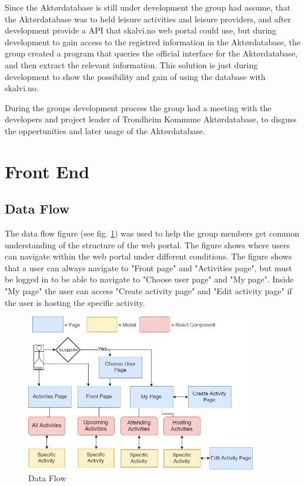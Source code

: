 Since the Aktørdatabase is still under development the group had assume, that the Aktørdatabase was to held leisure activities and leisure providers, and after development provide a API that skalvi.no web portal could use, but during development to gain access to the registred information in the Aktørdatabase, the group created a program that queries the official interface for the Aktørdatabase, and then extract the relevant information. This solution is just during development to show the possibility and gain of using the database with skalvi.no. 

During the groups development process the group had a meeting with the developers and project leader of Trondheim Kommune Aktørdatabase, to disguss the oppertunities and later usage of the Aktørdatabase.

\section{Front End}

\subsection{Data Flow}
The data flow figure (see fig. \ref{Data_Flow_Diagram}) was used to help the group members get common understanding of the structure of the web portal. The figure shows where users can navigate within the web portal under different conditions. The figure shows that a user can always navigate to "Front page" and "Activities page", but must be logged in to be able to navigate to "Choose user page" and "My page". Inside "My page" the user can access "Create activity page" and "Edit activity page" if the user is hosting the specific activity. 

\begin{figure}[H]
\centering
    \includegraphics[width=0.9\textwidth]{fig/dataFlow}
\caption{Data Flow}
\label{Data_Flow_Diagram}
\end{figure}

